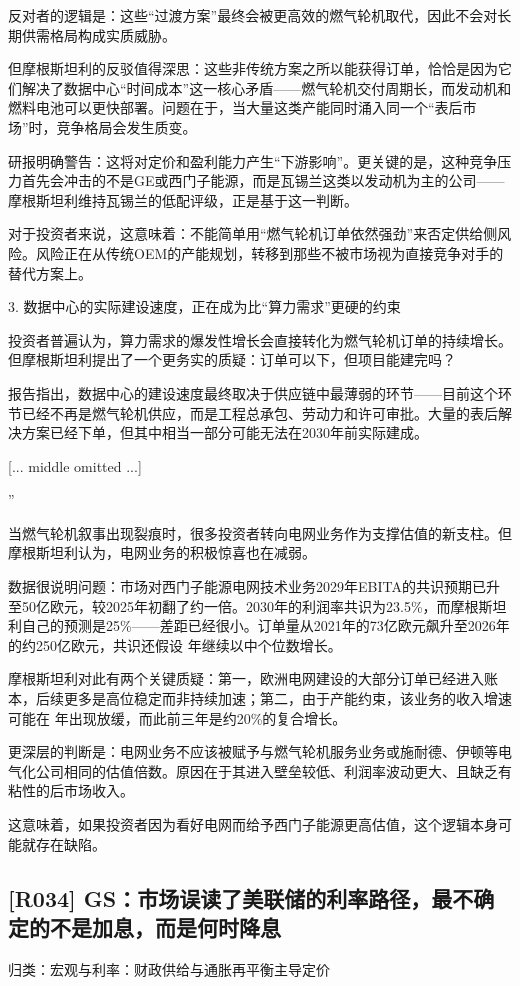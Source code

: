\documentclass[11pt]{ctexart}
\begin{document}
反对者的逻辑是：这些“过渡方案”最终会被更高效的燃气轮机取代，因此不会对长期供需格局构成实质威胁。

但摩根斯坦利的反驳值得深思：这些非传统方案之所以能获得订单，恰恰是因为它们解决了数据中心“时间成本”这一核心矛盾——燃气轮机交付周期长，而发动机和燃料电池可以更快部署。问题在于，当大量这类产能同时涌入同一个“表后市场”时，竞争格局会发生质变。

研报明确警告：这将对定价和盈利能力产生“下游影响”。更关键的是，这种竞争压力首先会冲击的不是GE或西门子能源，而是瓦锡兰这类以发动机为主的公司——摩根斯坦利维持瓦锡兰的低配评级，正是基于这一判断。

对于投资者来说，这意味着：不能简单用“燃气轮机订单依然强劲”来否定供给侧风险。风险正在从传统OEM的产能规划，转移到那些不被市场视为直接竞争对手的替代方案上。

3. 数据中心的实际建设速度，正在成为比“算力需求”更硬的约束

投资者普遍认为，算力需求的爆发性增长会直接转化为燃气轮机订单的持续增长。但摩根斯坦利提出了一个更务实的质疑：订单可以下，但项目能建完吗？

报告指出，数据中心的建设速度最终取决于供应链中最薄弱的环节——目前这个环节已经不再是燃气轮机供应，而是工程总承包、劳动力和许可审批。大量的表后解决方案已经下单，但其中相当一部分可能无法在2030年前实际建成。



[... middle omitted ...]

”

当燃气轮机叙事出现裂痕时，很多投资者转向电网业务作为支撑估值的新支柱。但摩根斯坦利认为，电网业务的积极惊喜也在减弱。

数据很说明问题：市场对西门子能源电网技术业务2029年EBITA的共识预期已升至50亿欧元，较2025年初翻了约一倍。2030年的利润率共识为23.5\%，而摩根斯坦利自己的预测是25\%——差距已经很小。订单量从2021年的73亿欧元飙升至2026年的约250亿欧元，共识还假设 年继续以中个位数增长。

摩根斯坦利对此有两个关键质疑：第一，欧洲电网建设的大部分订单已经进入账本，后续更多是高位稳定而非持续加速；第二，由于产能约束，该业务的收入增速可能在 年出现放缓，而此前三年是约20\%的复合增长。

更深层的判断是：电网业务不应该被赋予与燃气轮机服务业务或施耐德、伊顿等电气化公司相同的估值倍数。原因在于其进入壁垒较低、利润率波动更大、且缺乏有粘性的后市场收入。

这意味着，如果投资者因为看好电网而给予西门子能源更高估值，这个逻辑本身可能就存在缺陷。

\subsection{[R034] GS：市场误读了美联储的利率路径，最不确定的不是加息，而是何时降息}
{\small\color{refgray}归类：宏观与利率：财政供给与通胀再平衡主导定价}
\end{document}
